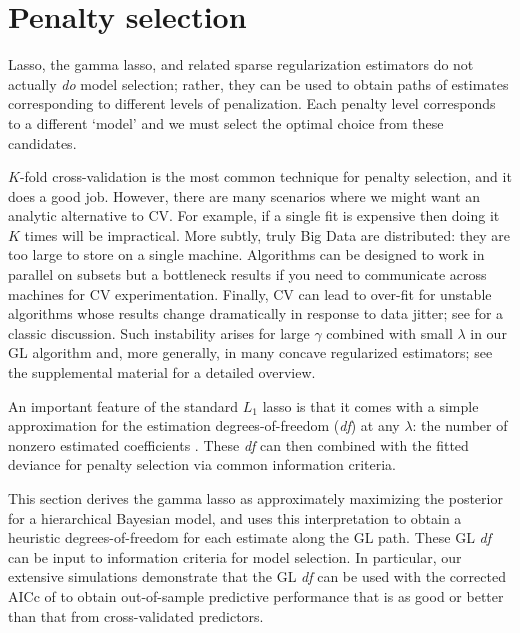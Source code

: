 \documentclass[twoside]{article}
\begin{document}
\section{Penalty selection}
\label{sec:select}

Lasso, the gamma lasso, and related 
sparse regularization estimators do not actually {\it do} model selection; rather, they
can be used to obtain paths of estimates corresponding to different levels of
penalization.  Each penalty level corresponds to a different `model'
and we must select the optimal choice from these candidates.

$K$-fold cross-validation \cite[CV; e.g.,][]{efron_estimation_2004} 
is the most common technique for penalty selection, and it does a good job.  However, there are many scenarios where
we might want an analytic alternative to CV.  For example, if a single fit is expensive then doing it $K$
times will be impractical.  More subtly, truly Big Data are distributed: they
are too large to store on a single machine. Algorithms can be designed to work
in parallel on subsets
\citep[e.g.,][]{taddy_distributed_2015} but a bottleneck
results if you need to communicate across machines for CV experimentation.
Finally, CV can lead to over-fit for unstable algorithms whose
results change dramatically in response to data jitter; see
\cite{breiman_heuristics_1996} for a classic discussion.  Such instability
arises for large $\gamma$ combined with small $\lambda$ in our GL algorithm
and, more generally, in many concave regularized estimators; see the
supplemental material for a detailed overview.

An important feature of the standard $L_1$ lasso is that it comes with a
simple approximation for the estimation degrees-of-freedom (\textit{df}) at
any $\lambda$: the number of nonzero estimated coefficients
\citep[see][]{zou_degrees_2007}.  These \textit{df} can then combined with the fitted
deviance for penalty selection via common information criteria.

This section derives the gamma lasso as approximately maximizing the posterior
for a hierarchical Bayesian model, and uses this
interpretation to obtain a heuristic degrees-of-freedom for each estimate
along the GL path.  These GL \textit{df} can  be input to information criteria
for model selection. In particular, our extensive simulations demonstrate that the GL
\textit{df} can be used with  the corrected AICc of
\citet{hurvich_regression_1989}  to obtain out-of-sample predictive
performance that is as good or better than that from cross-validated
predictors.
\end{document}
